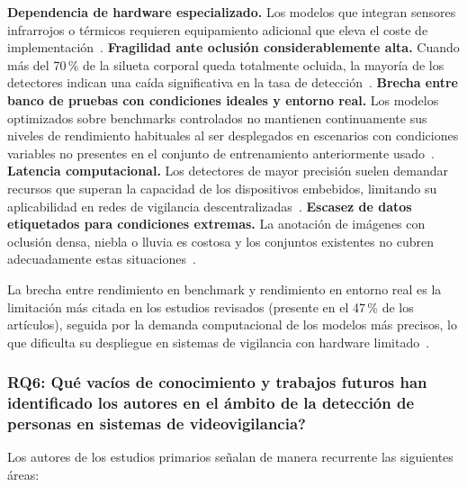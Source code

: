 \documentclass[12pt, a4paper]{article}
\begin{document}
\textbf{Dependencia de hardware especializado.} Los modelos que
integran sensores infrarrojos o t\'{e}rmicos requieren equipamiento
adicional que eleva el coste de implementaci\'{o}n~\cite{E14, E26}.
\textbf{Fragilidad ante oclusi\'{o}n considerablemente alta.} Cuando m\'{a}s del
70\,\% de la silueta corporal queda totalmente ocluida, la mayor\'{i}a de los
detectores indican una ca\'{i}da significativa en la tasa de
detecci\'{o}n~\cite{E27, E11}.
\textbf{Brecha entre banco de pruebas con condiciones ideales y entorno real.} Los modelos
optimizados sobre benchmarks controlados no mantienen continuamente sus niveles de
rendimiento habituales al ser desplegados en escenarios con condiciones
variables no presentes en el conjunto de
entrenamiento anteriormente usado~\cite{E33, E23}.
\textbf{Latencia computacional.} Los detectores de mayor precisi\'{o}n
suelen demandar recursos que superan la capacidad de los dispositivos
embebidos, limitando su aplicabilidad en redes de vigilancia
descentralizadas~\cite{E32, E23}.
\textbf{Escasez de datos etiquetados para condiciones extremas.}
La anotaci\'{o}n de im\'{a}genes con oclusi\'{o}n densa, niebla o
lluvia es costosa y los conjuntos existentes no cubren adecuadamente
estas situaciones~\cite{E31, E07}.

\begin{hallazgo}[]
  La brecha entre rendimiento en benchmark y rendimiento en entorno real
  es la limitaci\'{o}n m\'{a}s citada en los estudios revisados
  (presente en el 47\,\% de los art\'{i}culos), seguida por la demanda
  computacional de los modelos m\'{a}s precisos, lo que dificulta su
  despliegue en sistemas de vigilancia con hardware
  limitado~\cite{E27, E33, E11, E23}.
\end{hallazgo}

\subsubsection{RQ6: \textquestiondown Qu\'{e} vac\'{i}os de conocimiento
y trabajos futuros han identificado los autores en el \'{a}mbito de la
detecci\'{o}n de personas en sistemas de videovigilancia?}

Los autores de los estudios primarios se\~{n}alan de manera recurrente
las siguientes \'{a}reas:
\end{document}
